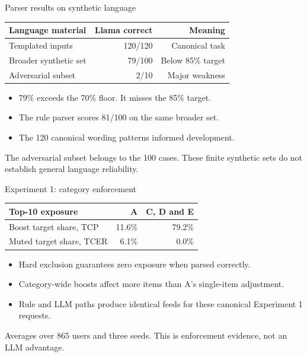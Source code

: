 \documentclass[10pt]{beamer}
\newcommand{\toprule}{\hline}
\newcommand{\midrule}{\hline}
\newcommand{\bottomrule}{\hline}
\newcommand{\src}[1]{\vfill{\tiny\color{bcitgray}#1}}
\begin{document}
\begin{frame}{Parser results on synthetic language}
\begin{tabular}{@{}lrr@{}}
\toprule
Language material & Llama correct & Meaning\\\midrule
Templated inputs & 120/120 & Canonical task\\
Broader synthetic set & 79/100 & Below 85\% target\\
Adversarial subset & 2/10 & Major weakness\\\bottomrule
\end{tabular}\par
\vspace{0.3cm}
\begin{itemize}
\item 79\% exceeds the 70\% floor. It misses the 85\% target.
\item The rule parser scores 81/100 on the same broader set.
\item The 120 canonical wording patterns informed development.
\end{itemize}
\src{The adversarial subset belongs to the 100 cases. These finite synthetic sets do not establish general language reliability.}
\end{frame}

\begin{frame}{Experiment 1: category enforcement}
\begin{tabular}{@{}lrr@{}}
\toprule
Top-10 exposure & A & C, D and E\\\midrule
Boost target share, TCP & 11.6\% & 79.2\%\\[0.15cm]
Muted target share, TCER & 6.1\% & 0.0\%\\\bottomrule
\end{tabular}\par
\vspace{0.4cm}
\begin{itemize}
\item Hard exclusion guarantees zero exposure when parsed correctly.
\item Category-wide boosts affect more items than A's single-item adjustment.
\item Rule and LLM paths produce identical feeds for these canonical Experiment 1 requests.
\end{itemize}
\src{Averages over 865 users and three seeds. This is enforcement evidence, not an LLM advantage.}
\end{frame}
\end{document}
